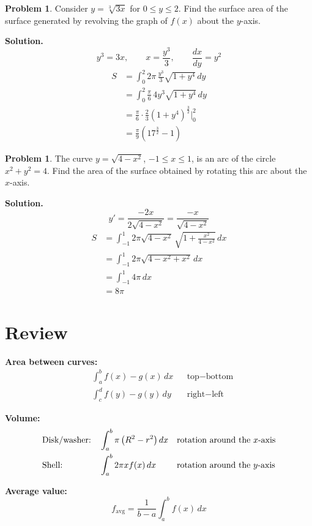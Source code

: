 \documentclass[10pt,fleqn,leqno]{article}
\theoremstyle{definition}
\newtheorem{problem}[equation]{Problem}
\begin{document}
\begin{problem}
Consider \( y=\sqrt[3]{3x} \) for \( 0\le y\le 2 \). Find the surface area of the surface generated by revolving the graph of \( f(x) \) about the \( y \)-axis.
\end{problem}

\textbf{Solution.}
\[
	y^3 = 3x, \qquad x = \frac{y^3}{3}, \qquad \frac{dx}{dy} = y^2
\]
\begin{align*}
	S &= \int_0^2 2\pi\, \frac{y^3}{3} \sqrt{1+y^4}\, dy \\
	  &= \int_0^2 \frac{\pi}{6}\, 4y^3 \sqrt{1+y^4}\, dy \\
	  &= \frac{\pi}{6} \cdot \frac{2}{3} \left( 1+y^4 \right)^{\frac{3}{2}} \Bigg|_0^2 \\
	  &= \frac{\pi}{9} \left( 17^{\frac{3}{2}} - 1 \right)
\end{align*}

\begin{problem}
The curve \( y=\sqrt{4-x^2} \), \( -1\le x\le 1 \), is an arc of the circle \( x^2+y^2=4 \). Find the area of the surface obtained by rotating this arc about the \( x \)-axis.
\end{problem}

\textbf{Solution.}
\[
	y' = \frac{-2x}{2\sqrt{4-x^2}} = \frac{-x}{\sqrt{4-x^2}}
\]
\begin{align*}
	S &= \int_{-1}^{1} 2\pi \sqrt{4-x^2}\, \sqrt{1+\frac{x^2}{4-x^2}}\, dx \\
	  &= \int_{-1}^{1} 2\pi \sqrt{4-x^2+x^2}\, dx \\
	  &= \int_{-1}^{1} 4\pi \, dx \\
	  &= 8\pi
\end{align*}

\section*{Review}

\textbf{Area between curves:}
\begin{align*}
	&\int_a^b f(x)-g(x)\, dx && \text{top} - \text{bottom} \\
	&\int_c^d f(y)-g(y)\, dy && \text{right} - \text{left}
\end{align*}

\textbf{Volume:}
\begin{align*}
	&\text{Disk/washer:} & &\int_a^b \pi \left( R^2-r^2 \right) dx && \text{rotation around the \( x \)-axis} \\
	&\text{Shell:} & &\int_a^b 2\pi x f(x)\, dx && \text{rotation around the \( y \)-axis}
\end{align*}

\textbf{Average value:}
\[
	f_{\text{avg}} = \frac{1}{b-a} \int_a^b f(x)\, dx
\]
\end{document}

